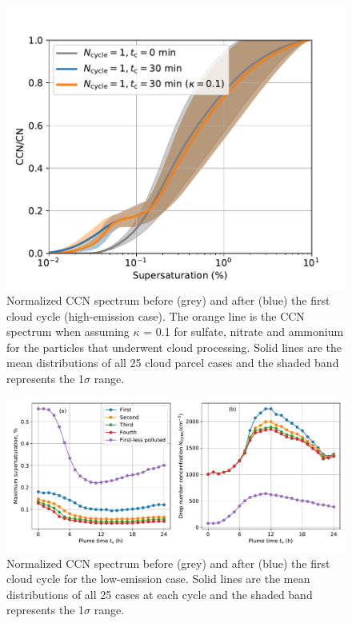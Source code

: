 \documentclass[edeposit,fullpage]{uiucthesis2009}
\begin{document}
\begin{figure}
    \centering
    \includegraphics[scale=0.5]{chap3_figs/fig_sup7.pdf}
    \caption{Normalized CCN spectrum before (grey) and after (blue)
      the first cloud cycle (high-emission case). The orange line is
      the CCN spectrum when assuming $\kappa$ = 0.1 for sulfate,
      nitrate and ammonium for the particles that underwent cloud
      processing. Solid lines are the mean distributions of all 25
      cloud parcel cases and the shaded band represents the 1$\sigma$
      range.}
    \label{fig:sup-new-kappa}
\end{figure}

\begin{figure}
    \centering
    \includegraphics[scale=0.5]{chap3_figs/fig_sup5.pdf}
    \caption{Normalized CCN spectrum before (grey) and after (blue)
      the first cloud cycle for the low-emission case. Solid lines are
      the mean distributions of all 25 cases at each cycle and the
      shaded band represents the 1$\sigma$ range.}
    \label{fig:sup-ccn-low-emi}
\end{figure}
\end{document}
